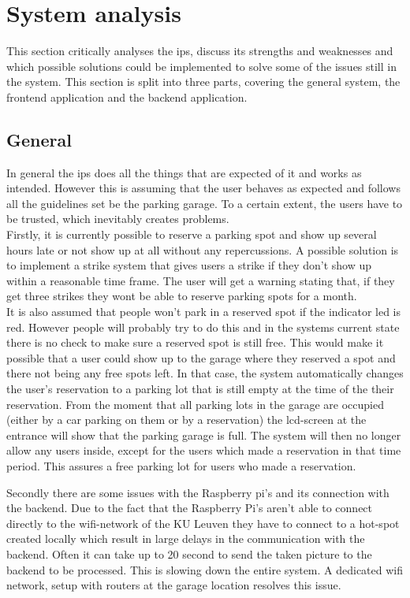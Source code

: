 \section{System analysis}\label{sec:system analysis}
This section critically analyses the \ac{ips}, discuss its strengths and weaknesses and which possible solutions could be implemented to solve some of the issues still in the system. This section is split into three parts, covering the general system, the frontend application and the  backend application.

\subsection{General}
In general the \ac{ips} does all the things that are expected of it and works as intended. However this is assuming that the user behaves as expected and follows all the guidelines set be the parking garage. To a certain extent, the users have to be trusted, which inevitably creates problems. \\

 Firstly, it is currently possible to reserve a parking spot and show up several hours late or not show up at all without any repercussions. A possible solution is to implement a strike system that gives users a strike if they don't show up within a reasonable time frame. The user will get a warning stating that, if they get three strikes they wont be able to reserve parking spots for a month. \\

\ind It is also assumed that people won't park in a reserved spot if the indicator \ac{led} is red. However people will probably try to do this and in the systems current state there is no check to make sure a reserved spot is still free. This would make it possible that a user could show up to the garage where they reserved a spot and there not being any free spots left. In that case, the system automatically changes the user's reservation to a parking lot that is still empty at the time of the their reservation. From the moment that all parking lots in the garage are occupied (either by a car parking on them or by a reservation) the \ac{lcd}-screen at the entrance will show that the parking garage is full. The system will then no longer allow any users inside, except for the users which made a reservation in that time period. This assures a free parking lot for users who made a reservation.

\ind Secondly there are some issues with the Raspberry pi's and its connection with the backend. Due to the fact that the Raspberry Pi's aren't able to connect directly to the \ac{wifi}-network of the KU Leuven they have to connect to a hot-spot created locally which result in large delays in the communication with the backend. Often it can take up to 20 second to send the taken picture to the backend to be processed. This is slowing down the entire system. A dedicated \ac{wifi} network, setup with routers at the garage location resolves this issue.

